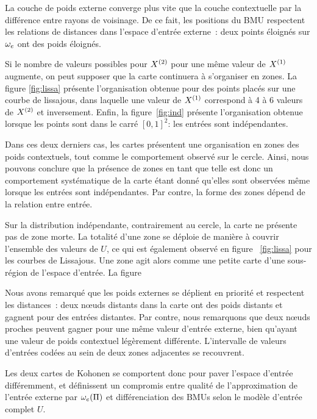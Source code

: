 \documentclass[../main]{subfiles}
\begin{document}
La couche de poids externe converge plus vite que la couche contextuelle par la différence entre rayons de voisinage. De ce fait, les positions du BMU respectent les relations de distances dans l'espace d'entrée externe~: deux points éloignés sur $\omega_e$ ont des poids éloignés.

Si le nombre de valeurs possibles pour $X^{({2})}$ pour une même valeur de $X^{({1})}$ augmente, on peut supposer que la carte continuera à s'organiser en zones.
La figure \ref{fig:lissa} présente l'organisation obtenue pour des points placés sur une courbe de lissajous, dans laquelle une valeur de $X^{({1})}$ correspond à 4 à 6 valeurs de $X^{({2})}$ et inversement. Enfin, la figure~\ref{fig:ind} présente l'organisation obtenue lorsque les points sont dans le carré $[0,1]^2$: les entrées sont indépendantes.

Dans ces deux derniers cas, les cartes présentent une organisation en zones des poids contextuels, tout comme le comportement observé sur le cercle. 
Ainsi, nous pouvons conclure que la présence de zones en tant que telle est donc un comportement systématique de la carte étant donné qu'elles sont observées même lorsque les entrées sont indépendantes. Par contre, la forme des zones dépend de la relation entre entrée.

Sur la distribution indépendante, contrairement au cercle, la carte ne présente pas de zone morte. La totalité d'une zone se déploie de manière à couvrir l'ensemble des valeurs de $U$, ce qui est également observé en figure ~\ref{fig:lissa} pour les courbes de Lissajous. 
Une zone agit alors comme une petite carte d'une sous-région de l'espace d'entrée. La figure 

Nous avons remarqué que les poids externes se déplient en priorité et respectent les distances~: deux n\oe{}uds distants dans la carte ont des poids distants et gagnent pour des entrées distantes.  
Par contre, nous remarquons que deux n\oe{}uds proches peuvent gagner pour une même valeur d'entrée externe, bien qu'ayant une valeur de poids contextuel légèrement différente.
L'intervalle de valeurs d'entrées codées au sein de deux zones adjacentes se recouvrent.

Les deux cartes de Kohonen se comportent donc pour paver l'espace d'entrée différemment, et définissent un compromis entre qualité de l'approximation de l'entrée externe par $\omega_e(\Pi)$ et différenciation des BMUs selon le modèle d'entrée complet $U$.
\end{document}
